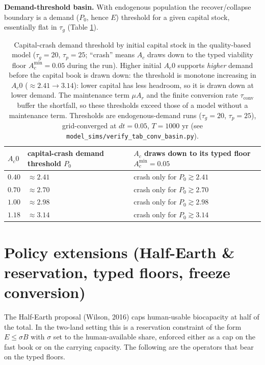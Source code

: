 \documentclass[11pt]{article}
\begin{document}
\noindent\textbf{Demand-threshold basin.} With endogenous population the recover/collapse boundary is a demand
($P_0$, hence $E$) threshold for a given capital stock, essentially flat in $\tau_g$ (Table
\ref{tab:basin}).

\begin{table}[htbp]
\centering
\small
\begin{tabularx}{\textwidth}{l>{\raggedright\arraybackslash}X>{\raggedright\arraybackslash}X}
\toprule
$A_c0$ & capital-crash demand threshold $P_0$ & $A_c$ draws down to its typed floor $A_c^{\min}=0.05$ \\
\midrule
$0.40$ & $\approx 2.41$ & crash only for $P_0\gtrsim2.41$ \\
$0.70$ & $\approx 2.70$ & crash only for $P_0\gtrsim2.70$ \\
$1.00$ & $\approx 2.98$ & crash only for $P_0\gtrsim2.98$ \\
$1.18$ & $\approx 3.14$ & crash only for $P_0\gtrsim3.14$ \\
\bottomrule
\end{tabularx}
\caption{Capital-crash demand threshold by initial capital stock in the quality-based model ($\tau_g=20$,
$\tau_p=25$; ``crash'' means $A_c$ draws down to the typed viability floor $A_c^{\min}=0.05$ during the run).
Higher initial $A_c0$ supports \emph{higher} demand before the capital book is drawn down: the threshold is
monotone increasing in $A_c0$ ($\approx2.41\to3.14$): lower capital has less headroom, so it is drawn down at
lower demand. The maintenance term $\mu A_r$ and the finite conversion rate $\tau_{\mathrm{conv}}$ buffer the
shortfall, so these thresholds exceed those of a model without a maintenance term. Thresholds are
endogenous-demand runs ($\tau_g=20$, $\tau_p=25$), grid-converged at $dt=0.05$, $T=1000$ yr
(see \texttt{model\_sims/verify\_tab\_conv\_basin.py}).}
\label{tab:basin}
\end{table}

\section{Policy extensions (Half-Earth \& reservation, typed floors, freeze conversion)}

The Half-Earth proposal (Wilson, 2016) caps human-usable biocapacity at half of the total. In the two-land setting this is a reservation constraint of the form $E\le\sigma B$ with $\sigma$ set to the human-available share, enforced either as a cap on the fast book or on the carrying capacity. The following are the operators that bear on the typed floors.
\end{document}
